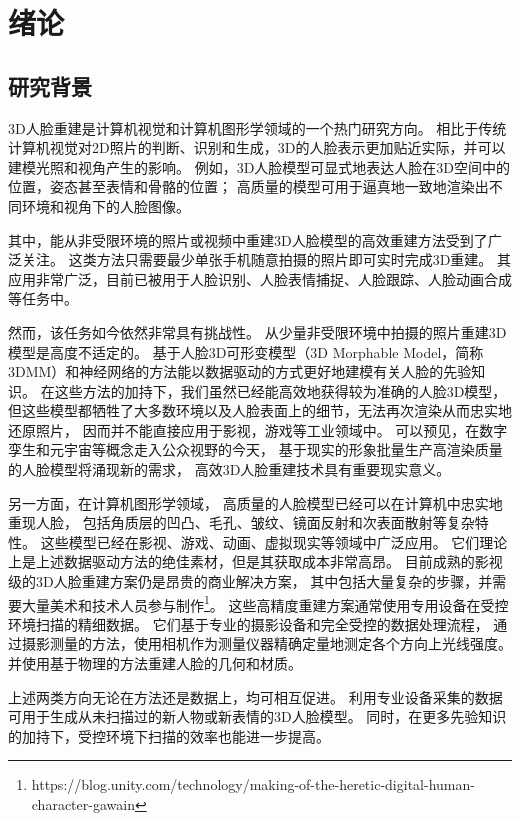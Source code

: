 \chapter{绪论}
\label{chap:intro}

\section{研究背景}

3D人脸重建是计算机视觉和计算机图形学领域的一个热门研究方向。
相比于传统计算机视觉对2D照片的判断、识别和生成，3D的人脸表示更加贴近实际，并可以建模光照和视角产生的影响。
例如，3D人脸模型可显式地表达人脸在3D空间中的位置，姿态甚至表情和骨骼的位置；
高质量的模型可用于逼真地一致地渲染出不同环境和视角下的人脸图像。

其中，能从非受限环境的照片或视频中重建3D人脸模型的高效重建方法受到了广泛关注。
这类方法只需要最少单张手机随意拍摄的照片即可实时完成3D重建。
其应用非常广泛，目前已被用于人脸识别\citep{BlanzV03,1022631413.nh}、人脸表情捕捉\cite{Mo2022TowardsAF}、人脸跟踪\citep{Pham2016RobustRP}、人脸动画合成\citep{Cao20133DSR}等任务中。

然而，该任务如今依然非常具有挑战性。
从少量非受限环境中拍摄的照片重建3D模型是高度不适定的。
基于人脸3D可形变模型（3D Morphable Model，简称3DMM）和神经网络的方法能以数据驱动的方式更好地建模有关人脸的先验知识。
在这些方法的加持下，我们虽然已经能高效地获得较为准确的人脸3D模型，
但这些模型都牺牲了大多数环境以及人脸表面上的细节，无法再次渲染从而忠实地还原照片，
因而并不能直接应用于影视，游戏等工业领域中。
可以预见，在数字孪生和元宇宙等概念走入公众视野的今天，
基于现实的形象批量生产高渲染质量的人脸模型将涌现新的需求，
高效3D人脸重建技术具有重要现实意义。

另一方面，在计算机图形学领域，
高质量的人脸模型已经可以在计算机中忠实地重现人脸，
包括角质层的凹凸、毛孔、皱纹、镜面反射和次表面散射等复杂特性。
这些模型已经在影视、游戏、动画、虚拟现实等领域中广泛应用。
它们理论上是上述数据驱动方法的绝佳素材，但是其获取成本非常高昂。
目前成熟的影视级的3D人脸重建方案仍是昂贵的商业解决方案，
其中包括大量复杂的步骤，并需要大量美术和技术人员参与制作\footnote{https://blog.unity.com/technology/making-of-the-heretic-digital-human-character-gawain}。
这些高精度重建方案通常使用专用设备在受控环境扫描的精细数据。
它们基于专业的摄影设备和完全受控的数据处理流程，
通过摄影测量的方法，使用相机作为测量仪器精确定量地测定各个方向上光线强度。
并使用基于物理的方法重建人脸的几何和材质。

上述两类方向无论在方法还是数据上，均可相互促进。
利用专业设备采集的数据可用于生成从未扫描过的新人物或新表情的3D人脸模型。
同时，在更多先验知识的加持下，受控环境下扫描的效率也能进一步提高。

